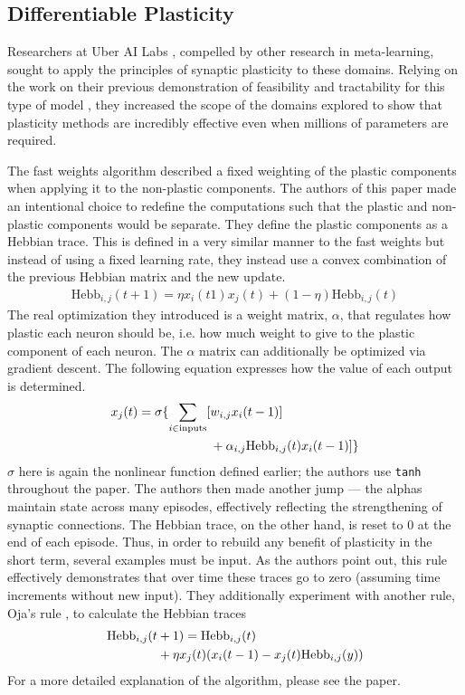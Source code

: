 \documentclass{article}
\begin{document}
\subsection{Differentiable Plasticity}
Researchers at Uber AI Labs \cite{Miconi18}, compelled by other research in meta-learning, sought
to apply the principles of synaptic plasticity to these domains. Relying on the
work on their previous demonstration of feasibility and tractability for
this type of model \cite{Miconi16}, they increased the scope of the domains explored to show
that plasticity methods are incredibly effective even when millions of parameters
are required.

The fast weights algorithm described a fixed weighting of the plastic components
when applying it to the non-plastic components. The authors of this paper made
an intentional choice to redefine the computations such that the plastic and
non-plastic components would be separate. They define the plastic components as
a Hebbian trace. This is defined in a very similar manner to the fast weights
but instead of using a fixed learning rate, they instead use a convex combination
of the previous Hebbian matrix and the new update.
\begin{align}
  \text{Hebb}_{i,j}(t+1) = \eta x_i(t 1)x_j(t)+(1-\eta)\text{Hebb}_{i,j}(t)
\end{align}
The real optimization they introduced
is a weight matrix, $\alpha$, that regulates how plastic each neuron should be,
i.e. how much weight to give to the plastic component of each neuron. The $\alpha$ matrix
can additionally be optimized via gradient descent. The following
equation expresses how the value of each output is determined.
\begin{align}
  x_j(t) = \sigma \{\sum_{i\in \text{inputs}} [&w_{i,j}x_i(t-1)]\notag\\
  &+ \alpha_{i,j}\text{Hebb}_{i,j}(t)x_i(t-1)]\}
\end{align}
$\sigma$ here is again the nonlinear function defined earlier; the authors
use \texttt{tanh} throughout the paper.
The authors then made another jump --- the alphas maintain state across many
episodes, effectively reflecting the strengthening of synaptic connections.
The Hebbian trace, on the other hand, is reset to 0 at the end of each episode.
Thus, in order to rebuild any benefit of plasticity in the short term,
several examples must be input. As the authors point out, this rule effectively
demonstrates that over time these traces go to zero (assuming time increments
without new input). They additionally experiment with another rule, Oja's rule \cite{Oja08},
to calculate the Hebbian traces
\begin{align}
  \text{Hebb}_{i,j}(t & +1) = \text{Hebb}_{i,j}(t)\notag\\
  & +\eta x_j (t)(x_i(t-1) - x_j(t)\text{Hebb}_{i,j}(y))
\end{align}
For a more detailed explanation of the algorithm, please see the paper.
\end{document}
